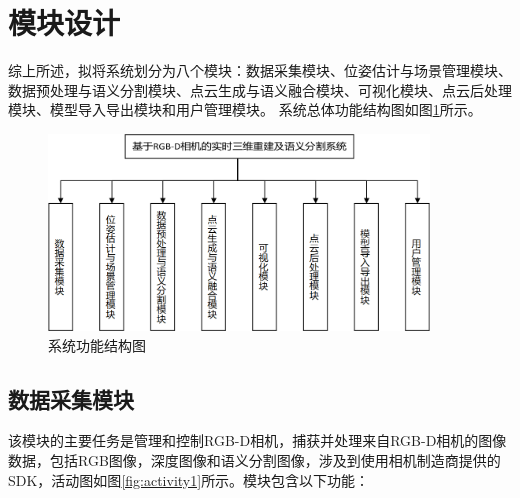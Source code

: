 \section{模块设计}

\par 综上所述，拟将系统划分为八个模块：数据采集模块、位姿估计与场景管理模块、数据预处理与语义分割模块、点云生成与语义融合模块、可视化模块、点云后处理模块、模型导入导出模块和用户管理模块。
系统总体功能结构图如图\ref{fig:function}所示。

\begin{figure}[htb]
	\centering
	\includegraphics[width=0.9\textwidth]{figures/uml/function_all.png}
	\caption{系统功能结构图}
	\label{fig:function}
\end{figure}

\subsection{数据采集模块}
\par 该模块的主要任务是管理和控制RGB-D相机，捕获并处理来自RGB-D相机的图像数据，包括RGB图像，深度图像和语义分割图像，涉及到使用相机制造商提供的SDK，活动图如图\ref{fig:activity1}所示。模块包含以下功能：

